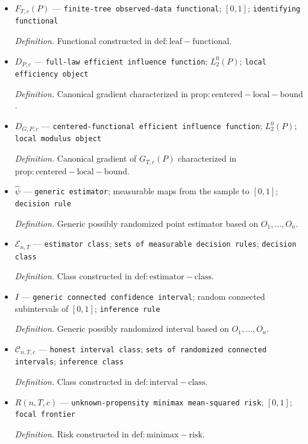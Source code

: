 \documentclass{article}
\begin{document}
\begin{itemize}
  \item \(F_{T,c}(P)\) --- \texttt{finite-\allowbreak{}tree observed-\allowbreak{}data functional}; \([0,1]\); \texttt{identifying functional}
  \par\smallskip\noindent\emph{Definition.} Functional constructed in \(\mathrm{def:leaf-functional}\).
  \item \(D_{P,c}\) --- \texttt{full-\allowbreak{}law efficient influence function}; \(L_2^0(P)\); \texttt{local efficiency object}
  \par\smallskip\noindent\emph{Definition.} Canonical gradient characterized in \(\mathrm{prop:centered-local-bound}\).
  \item \(D_{G,P,c}\) --- \texttt{centered-\allowbreak{}functional efficient influence function}; \(L_2^0(P)\); \texttt{local modulus object}
  \par\smallskip\noindent\emph{Definition.} Canonical gradient of \(G_{T,c}(P)\) characterized in \(\mathrm{prop:centered-local-bound}\).
  \item \(\widehat\psi\) --- \texttt{generic estimator}; measurable maps from the sample to \([0,1]\); \texttt{decision rule}
  \par\smallskip\noindent\emph{Definition.} Generic possibly randomized point estimator based on \(O_1,\ldots,O_n\).
  \item \(\mathcal E_{n,T}\) --- \texttt{estimator class}; \texttt{sets of measurable decision rules}; \texttt{decision class}
  \par\smallskip\noindent\emph{Definition.} Class constructed in \(\mathrm{def:estimator-class}\).
  \item \(I\) --- \texttt{generic connected confidence interval}; random connected subintervals of \([0,1]\); \texttt{inference rule}
  \par\smallskip\noindent\emph{Definition.} Generic possibly randomized interval based on \(O_1,\ldots,O_n\).
  \item \(\mathcal C_{n,T,c}\) --- \texttt{honest interval class}; \texttt{sets of randomized connected intervals}; \texttt{inference class}
  \par\smallskip\noindent\emph{Definition.} Class constructed in \(\mathrm{def:interval-class}\).
  \item \(R(n,T,c)\) --- \texttt{unknown-\allowbreak{}propensity minimax mean-\allowbreak{}squared risk}; \([0,1]\); \texttt{focal frontier}
  \par\smallskip\noindent\emph{Definition.} Risk constructed in \(\mathrm{def:minimax-risk}\).

\end{itemize}
\end{document}

